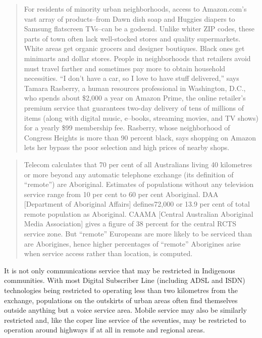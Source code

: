 \begin{quotation}
For residents of minority urban neighborhoods, access to Amazon.com's vast array of products--from Dawn dish soap and Huggies diapers to Samsung flatscreen TVs--can be a godsend. Unlike whiter ZIP codes, these parts of town often lack well-stocked stores and quality supermarkets. White areas get organic grocers and designer boutiques. Black ones get minimarts and dollar stores. People in neighborhoods that retailers avoid must travel farther and sometimes pay more to obtain household necessities. ``I don't have a car, so I love to have stuff delivered,'' says Tamara Rasberry, a human resources professional in Washington, D.C., who spends about \$2,000 a year on Amazon Prime, the online retailer's premium service that guarantees two-day delivery of tens of millions of items (along with digital music, e--books, streaming movies, and TV shows) for a yearly \$99 membership fee. Rasberry, whose neighborhood of Congress Heights is more than 90 percent black, says shopping on Amazon lets her bypass the poor selection and high prices of nearby shops\cite{RefWorks:289}.
\end{quotation}

\begin{quotation}
Telecom calculates that 70 per cent of all Australians living 40 kilometres or more beyond any automatic telephone exchange (its definition of ``remote'') are Aboriginal. Estimates of populations without any television service range from 10 per cent to 60 per cent Aboriginal. DAA [Department of Aboriginal Affairs] defines72,000 or 13.9 per cent of total remote population as Aboriginal. CAAMA [Central Australian Aboriginal Media Association] gives a figure of 38 percent for the central RCTS service zone. But ``remote'' Europeans are more likely to be serviced than are Aborigines, hence higher percentages of ``remote'' Aborigines arise when service access rather than location, is computed\cite[p100]{RefWorks:25}.
\end{quotation}

It is not only communications service that may be restricted in Indigenous communities. With most Digital Subscriber Line (including ADSL and ISDN) technologies being restricted to operating less than two kilometres from the exchange,  populations on the outskirts of urban areas often find themselves outside anything but a voice service area. Mobile service may also be similarly restricted and, like the coper line service of the seventies, may be restricted to operation around highways if at all in remote and regional areas. 

